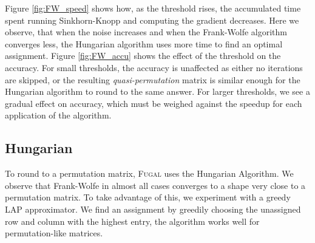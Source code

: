 Figure \ref{fig:FW_speed} shows how, as the threshold rises, the accumulated time spent running Sinkhorn-Knopp and computing the gradient decreases. Here we observe, that when the noise increases and when the Frank-Wolfe algorithm converges less, the Hungarian algorithm uses more time to find an optimal assignment. Figure \ref{fig:FW_accu} shows the effect of the threshold on the accuracy. For small thresholds, the accuracy is unaffected as either no iterations are skipped, or the resulting \textit{quasi-permutation} matrix is similar enough for the Hungarian algorithm to round to the same answer. For larger thresholds, we see a gradual effect on accuracy, which must be weighed against the speedup for each application of the algorithm. 

\fwbdtptn

\iffalse
\begin{figure}
    \centering
    \begin{tikzpicture}
    \begin{axis}[
        xlabel={X axis label}, %
        ylabel={Y axis label}, %
        legend style={at={(1.05,1)}, anchor=north west},
        scatter/classes={
            0.00_0.00={mark=square*,blue},
            0.00_0.01={mark=square*,red},
            0.00_0.05={mark=square*,black},
            0.01_0.00={mark=triangle*,blue},
            0.01_0.01={mark=triangle*,red},
            0.01_0.05={mark=triangle*,black},
            0.05_0.00={mark=o,blue},
            0.05_0.01={mark=o,red},
            0.05_0.05={mark=o,black}
        }
    ]
        \addplot[
            scatter,
            only marks,
            point meta=explicit symbolic,
            visualization depends on={value \thisrow{meta} \as \class},
            scatter src=explicit symbolic
        ] table[x index=0, y index=1, meta expr={\thisrow{shape} _ \thisrow{color}}] {\fwbdtptn};
    \end{axis}
    \end{tikzpicture}
    \caption{Caption}
    \label{fig:enter-label}
\end{figure}
\fi

\subsection{Hungarian}
To round to a permutation matrix, \textsc{Fugal} uses the Hungarian Algorithm. We observe that Frank-Wolfe in almost all cases converges to a shape very close to a permutation matrix. To take advantage of this, we experiment with a greedy LAP approximator. We find an assignment by greedily choosing the unassigned row and column with the highest entry, the algorithm works well for permutation-like matrices.\\

